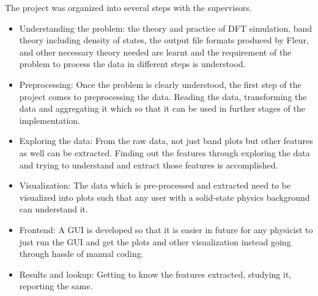 The project was organized into several steps with the supervisors.
\begin{itemize}
\item Understanding the problem: the theory and practice of DFT simulation, band
    theory including density of states, the output file formats produced by
    Fleur, and other necessary theory needed are learnt and the requirement of
    the problem to process the data in different steps is understood.
\item Preprocessing: Once the problem is clearly understood, the first step of
    the project comes to preprocessing the data. Reading the data, transforming
    the data and aggregating it which so that it can be used in further stages of
    the implementation.
\item Exploring the data: From the raw data, not just band plots but other 
    features as well can be extracted. Finding out the features through exploring the
    data and trying to understand and extract those features is accomplished.
\item Visualization: The data which is pre-processed and extracted need to be
    visualized into plots such that any user with a solid-state physics background
    can understand it.
\item Frontend: A GUI is developed so that it is easier in future for any
    physicist to just run the GUI and get the plots and other visualization
    instead going through hassle of manual coding.
\item Results and lookup: Getting to know the features extracted, studying it,
    reporting the same.
\end{itemize}


